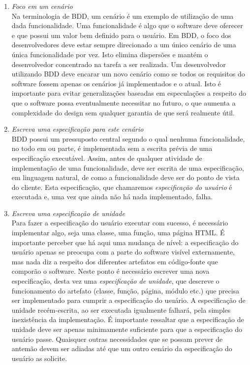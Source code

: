 \documentclass[a4paper,abntfigtabnum,noindentfirst]{abnt}
\begin{document}
\begin{enumerate}

\item \textit{Foco em um cenário}\\
Na terminologia de BDD, um cenário é um exemplo de utilização de uma dada funcionalidade. Uma funcionalidade é algo que o software deve oferecer e que possui um valor bem definido para o usuário. Em BDD, o foco dos desenvolvedores deve estar sempre direcionado a um único cenário de uma única funcionalidade por vez. Isto elimina dispersões e mantém o desenvolvedor concentrado na tarefa a ser realizada. Um desenvolvedor utilizando BDD deve encarar um novo cenário como se todos os requisitos do software fossem apenas os cenários já implementados e o atual. Isto é importante para evitar generalizações baseadas em especulações a respeito do que o software possa eventualmente necessitar no futuro, o que aumenta a complexidade do design sem qualquer garantia de que será realmente útil.

\item \textit{Escreva uma especificação para este cenário}\\
BDD possui um pressuposto central segundo o qual nenhuma funcionalidade, no todo em ou parte, é implementada sem a escrita prévia de uma especificação executável. Assim, antes de qualquer atividade de implementação de uma funcionalidade, deve ser escrita de uma especificação, em linguagem natural, de como a funcionalidade deve ser do ponto de vista do cliente. Esta especificação, que chamaremos \textit{especificação do usuário} é executada e, uma vez que ainda não há nada implementado, falha.

\item \textit{Escreva uma especificação de unidade}\\
Para fazer a especificação do usuário executar com sucesso, é necessário implementar algo, seja uma classe, uma função, uma página HTML. É importante perceber que há aqui uma mudança de nível: a especificação do usuário apenas se preocupa com a parte do software visível externamente, mas nada diz a respeito dos diferentes artefatos em código-fonte que comporão o software. Neste ponto é necessário escrever uma nova especificação, desta vez uma \textit{especificação de unidade}, que descreve o funcionamento do artefato (classe, função, página, módulo etc.) que precisa ser implementado para cumprir a especificação do usuário. A especificação de unidade recém-escrita, ao ser executada igualmente falhará, pela simples inexistência da implementação. É importante ressaltar que a especificação de unidade deve ser apenas minimamente suficiente para que a especificação do usuário passe. Quaisquer outras necessidades que se possam prever de antemão devem ser adiadas até que um outro cenário da especificação do usuário as solicite.


\end{enumerate}
\end{document}
